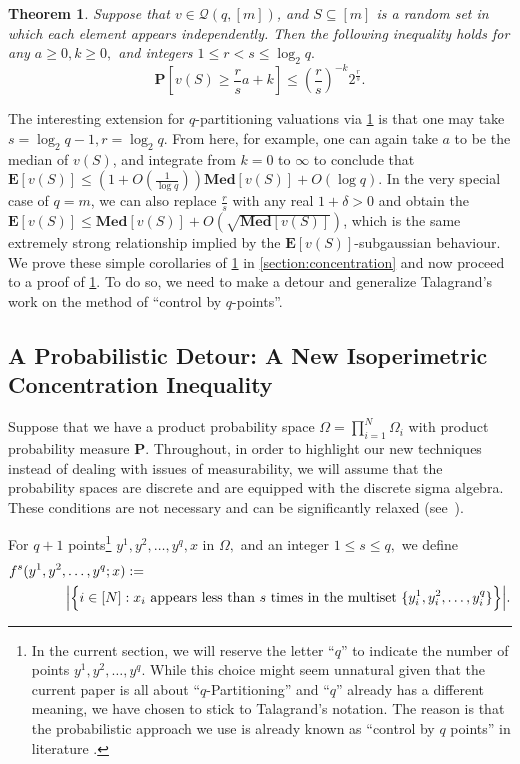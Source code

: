 \documentclass[11pt]{article}\usepackage{amsfonts}
\newtheorem{theorem}{Theorem}
\numberwithin{theorem}{subsection}
\newcommand{\prob}{\mathbf{P}}
\newcommand{\median}{\mathbf{Med}}
\newcommand{\expect}{\mathbf{E}}
\begin{document}
\begin{theorem}
\label{thm:qparttailspecial}
Suppose that $v\in \mathcal{Q}(q,[m])$, and $S\subseteq [m]$ is a random set in which each element appears independently. Then the following inequality holds for any $ a \ge 0, k\ge 0,$ and integers $1\le r < s\le \log_2 q.$
    $$
    \prob\left[v(S)\ge \frac{r}{s}a+k\right]\le 
    \left(\frac{r}{s}\right)^{-k}2^\frac{r}{s}.
    $$
\end{theorem}

 The interesting extension for $q$-partitioning valuations via \cref{thm:qparttailspecial} is that one may take\linebreak $s = \log_2 q-1, r = \log_2 q$. From here, for example, one can again take $a$ to be the median of $v(S)$, and integrate from $k=0$ to $\infty$ to conclude that $\expect[v(S)]\le (1 + O(\frac{1}{\log q}))\median[v(S)] + O(\log q).$
In the very special case of $q=m$, we can also replace $\frac{r}{s}$ with any real $1+ \delta >0$ and obtain the $\expect[v(S)]\le \median[v(S)] + O(\sqrt{\median[v(S)]})$, which is the same extremely strong relationship implied by the $\expect[v(S)]$-subgaussian behaviour. We prove these simple corollaries of \cref{thm:qparttailspecial} in \cref{section:concentration} and now proceed to 
a proof of 
\cref{thm:qparttailspecial}. To do so, we need to make a detour and generalize Talagrand's work on the method of ``control by $q$-points''.

\subsection{A Probabilistic Detour: A New Isoperimetric Concentration Inequality}
\label{section:detourisoperimetry}
Suppose that we have a product probability space $\Omega = \prod_{i=1}^N \Omega_i$ with product probability measure $\prob.$ Throughout, in order to highlight our new techniques instead of dealing with issues of measurability, we will assume that the probability spaces are discrete and are equipped with the discrete sigma algebra. These conditions are not necessary and can be significantly relaxed (see~\cite[Section 2.1]{Talagrand01}).

For  $q+1$ points\footnote{In the current section, we will reserve the letter ``$q$'' to indicate the number of points $y^1, y^2,\ldots, y^{q}.$ While this choice might seem unnatural given that the current paper is all about ``$q$-Partitioning''  and ``$q$'' already has a different meaning, we have chosen to stick to Talagrand's notation. The reason is that the probabilistic approach we use is already known as ``control by $q$ points'' in literature \cite[Section 3]{Talagrand01}.} $y^1, y^2,\ldots, y^{q}, x$ in $\Omega,$ and an integer $1\le s \le q,$ we define
\begin{equation}\label{eq:definefs}
\begin{split}
    f^s(y^1, y^2,  & \ldots, y^q; x) :=\\
       & \Big{|}\Big{\{}i\in [N]: x_i \text{ appears less than $s$ times in the multiset }  \{y^1_i, y^2_i, \ldots, y^q_i\}\Big{\}}\Big{|}.
\end{split}
\end{equation}
       
\end{document}
